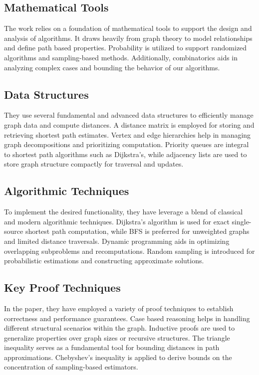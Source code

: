 \documentclass[a4paper,11pt,oneside]{book}
\begin{document}
\subsection*{Mathematical Tools}
The work relies on a  foundation of mathematical tools to support the design and analysis of algorithms. It draws heavily from graph theory to model relationships and define path based properties. Probability is utilized to support randomized algorithms and sampling-based methods. Additionally, combinatorics aids in analyzing complex cases and bounding the behavior of our algorithms.

\subsection*{Data Structures}
They use several fundamental and advanced data structures to efficiently manage graph data and compute distances. A distance matrix is employed for storing and retrieving shortest path estimates. Vertex and edge hierarchies help in managing graph decompositions and prioritizing computation. Priority queues are integral to shortest path algorithms such as Dijkstra’s, while adjacency lists are used to store graph structure compactly for traversal and updates.

\subsection*{Algorithmic Techniques}
To implement the desired functionality, they have leverage a blend of classical and modern algorithmic techniques. Dijkstra’s algorithm is used for exact single-source shortest path computation, while BFS is preferred for unweighted graphs and limited distance traversals. Dynamic programming aids in optimizing overlapping subproblems and recomputations. Random sampling is introduced for probabilistic estimations and constructing approximate solutions.

\subsection*{Key Proof Techniques}
In the paper, they have employed a variety of proof techniques to establish correctness and performance guarantees. Case based reasoning helps in handling different structural scenarios within the graph. Inductive proofs are used to generalize properties over graph sizes or recursive structures. The triangle inequality serves as a fundamental tool for bounding distances in path approximations. Chebyshev’s inequality is applied to derive bounds on the concentration of sampling-based estimators.
\end{document}

